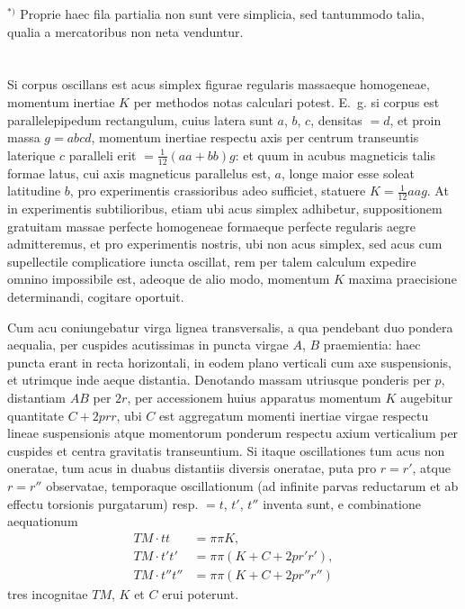 \documentclass[fontsize=11pt,paper=a4,twoside,openany]{scrbook}
\begin{document}
$^{*)}$ Proprie haec fila partialia non sunt vere simplicia, sed tantummodo talia, qualia a mercatoribus non neta venduntur.

\section{}

Si corpus oscillans est acus simplex figurae regularis massaeque homogeneae, momentum inertiae $K$ per methodos notas calculari potest. E.~g. si corpus est parallelepipedum rectangulum, cuius latera sunt $a$, $b$, $c$, densitas $=d$, et proin massa $g=abcd$, momentum inertiae respectu axis per centrum transeuntis laterique $c$ paralleli erit $=\frac{1}{12}(aa+bb)g$: et quum in acubus magneticis talis formae latus, cui axis magneticus parallelus est, $a$, longe maior esse soleat latitudine $b$, pro experimentis crassioribus adeo sufficiet, statuere $K=\frac{1}{12}aa g$. At in experimentis subtilioribus, etiam ubi acus simplex adhibetur, suppositionem gratuitam massae perfecte homogeneae formaeque perfecte regularis aegre admitteremus, et pro experimentis nostris, ubi non acus simplex, sed acus cum supellectile complicatiore iuncta oscillat, rem per talem calculum expedire omnino impossibile est, adeoque de alio modo, momentum $K$ maxima praecisione determinandi, cogitare oportuit.

Cum acu coniungebatur virga lignea transversalis, a qua pendebant duo pondera aequalia, per cuspides acutissimas in puncta virgae $A$, $B$ praemientia: haec puncta erant in recta horizontali, in eodem plano verticali cum axe suspensionis, et utrimque inde aeque distantia. Denotando massam utriusque ponderis per $p$, distantiam $AB$ per $2r$, per accessionem huius apparatus momentum $K$ augebitur quantitate $C+2prr$, ubi $C$ est aggregatum momenti inertiae virgae respectu lineae suspensionis atque momentorum ponderum respectu axium verticalium per cuspides et centra gravitatis transeuntium. Si itaque oscillationes tum acus non oneratae, tum acus in duabus distantiis diversis oneratae, puta pro $r=r'$, atque $r=r''$ observatae, temporaque oscillationum (ad infinite parvas reductarum et ab effectu torsionis purgatarum) resp. $=t$, $t'$, $t''$ inventa sunt, e combinatione aequationum
\begin{align*}
TM\cdot tt &= \pi\pi K,\\
TM\cdot t't' &= \pi\pi (K+C+2pr'r'),\\
TM\cdot t''t'' &= \pi\pi (K+C+2pr''r'')
\end{align*}
tres incognitae $TM$, $K$ et $C$ erui poterunt.
\end{document}
